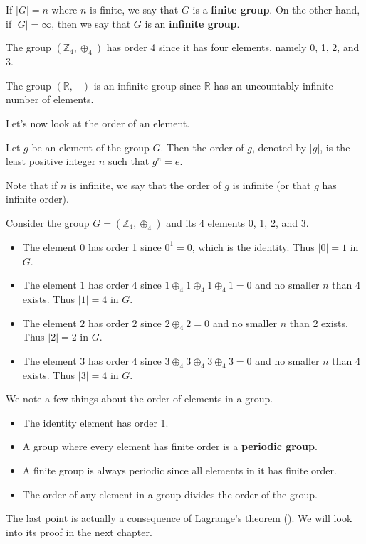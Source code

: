 If $|G| = n$ where $n$ is finite, we say that $G$ is a \textbf{finite group}. On the other hand, if $|G| = \infty$, then we say that $G$ is an \textbf{infinite group}.

\begin{example}
    The group $(\mathbb{Z}_4, \oplus_4)$ has order 4 since it has four elements, namely 0, 1, 2, and 3.
\end{example}

\begin{example}
    The group $(\mathbb{R}, +)$ is an infinite group since $\mathbb{R}$ has an uncountably infinite number of elements.
\end{example}

Let's now look at the order of an element.
\begin{definition}
    Let $g$ be an element of the group $G$. Then the order of $g$, denoted by $|g|$, is the least positive integer $n$ such that $g^n = e$.
\end{definition}
Note that if $n$ is infinite, we say that the order of $g$ is infinite (or that $g$ has infinite order).

\begin{example}
    Consider the group $G = (\mathbb{Z}_4, \oplus_4)$ and its 4 elements 0, 1, 2, and 3.
    \begin{itemize}
        \item The element $0$ has order 1 since $0^1 = 0$, which is the identity. Thus $|0| = 1$ in $G$.
        \item The element $1$ has order 4 since $1 \oplus_4 1 \oplus_4 1 \oplus_4 1 = 0$ and no smaller $n$ than 4 exists. Thus $|1| = 4$ in $G$.
        \item The element $2$ has order 2 since $2 \oplus_4 2 = 0$ and no smaller $n$ than 2 exists. Thus $|2| = 2$ in $G$.
        \item The element $3$ has order 4 since $3 \oplus_4 3 \oplus_4 3 \oplus_4 3 = 0$ and no smaller $n$ than 4 exists. Thus $|3| = 4$ in $G$.
    \end{itemize}
\end{example}

We note a few things about the order of elements in a group.
\begin{itemize}
    \item The identity element has order 1.
    \item A group where every element has finite order is a \textbf{periodic group}.
    \item A finite group is always periodic since all elements in it has finite order.
    \item The order of any element in a group divides the order of the group.
\end{itemize}
The last point is actually a consequence of Lagrange's theorem (). We will look into its proof in the next chapter.

